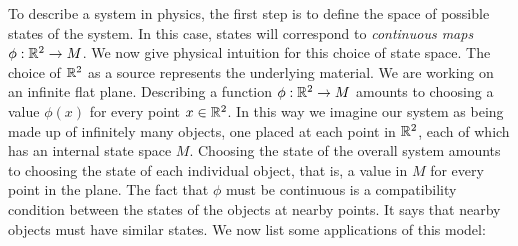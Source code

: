 To describe a system in physics, the first step is to define the space of possible states of the system. In this case, states will correspond to \textit{continuous maps $\phi: \mathbb{R}^2\to M$}. We now give physical intuition for this choice of state space. The choice of $\mathbb{R}^2$ as a source represents the underlying material. We are working on an infinite flat plane. Describing a function $\phi: \mathbb{R}^2\to M$ amounts to choosing a value $\phi(x)$ for every point $x\in \mathbb{R}^2$. In this way we imagine our system as being made up of infinitely many objects, one placed at each point in $\mathbb{R}^2$, each of which has an internal state space $M$. Choosing the state of the overall system amounts to choosing the state of each individual object, that is, a value in $M$ for every point in the plane. The fact that $\phi$ must be continuous is a compatibility condition between the states of the objects at nearby points. It says that nearby objects must have similar states. We now list some applications of this model:

